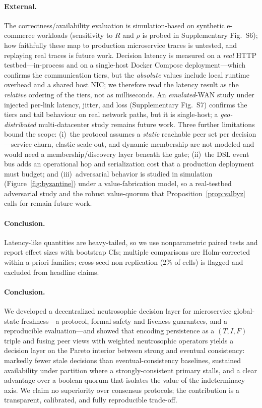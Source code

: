 \documentclass[11pt]{article}
\begin{document}
\paragraph{External.} The correctness/availability evaluation is simulation-based on synthetic
e-commerce workloads (sensitivity to $R$ and $\rho$ is probed in Supplementary Fig.~S6); how
faithfully these map to production microservice traces is untested, and replaying real traces is future
work. Decision latency is measured on a \emph{real} HTTP testbed---in-process and on a single-host Docker
Compose deployment---which confirms the communication tiers, but the \emph{absolute} values include local
runtime overhead and a shared host NIC; we therefore read the latency result as the \emph{relative}
ordering of the tiers, not as milliseconds. An \emph{emulated}-WAN study under injected per-link latency,
jitter, and loss (Supplementary Fig.~S7) confirms the tiers and tail behaviour on real network paths, but
it is single-host; a \emph{geo-distributed} multi-datacenter study remains future work.
Three further limitations bound the scope: (i)~the protocol assumes a \emph{static} reachable peer set
per decision---service churn, elastic scale-out, and dynamic membership are not modeled and would need a
membership/discovery layer beneath the gate; (ii)~the DSL event bus adds an operational hop and
serialization cost that a production deployment must budget; and (iii)~adversarial behavior is studied in
simulation (Figure~\ref{fig:byzantine}) under a value-fabrication model, so a real-testbed adversarial
study and the robust value-quorum that Proposition~\ref{prop:valbyz} calls for remain future work.

\paragraph{Conclusion.} Latency-like quantities are heavy-tailed, so we use nonparametric paired tests
and report effect sizes with bootstrap CIs; multiple comparisons are Holm-corrected within a-priori
families; cross-seed non-replication ($2\%$ of cells) is flagged and excluded from headline claims.

\paragraph{Conclusion.}
\label{sec:conclusion}

We developed a decentralized neutrosophic decision layer for microservice global-state freshness---a
protocol, formal safety and liveness guarantees, and a reproducible evaluation---and showed that
encoding persistence as a $(T,I,F)$ triple and fusing peer views with weighted neutrosophic operators
yields a decision layer on the Pareto interior between strong and eventual consistency: markedly fewer stale decisions than eventual-consistency baselines,
sustained availability under partition where a strongly-consistent primary stalls, and a clear
advantage over a boolean quorum that isolates the value of the indeterminacy axis. We claim no
superiority over consensus protocols; the contribution is a transparent, calibrated, and fully
reproducible trade-off.
\end{document}
